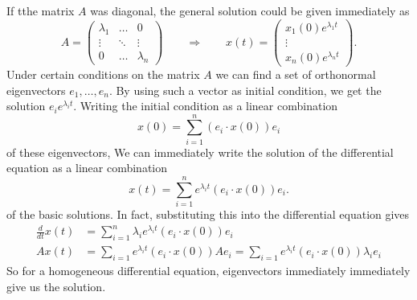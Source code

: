 If tthe matrix $A$ was diagonal, the general solution could be given
immediately as
\[
A=\begin{pmatrix}
\lambda_1&\dots&0\\
\vdots&\ddots&\vdots\\
0&\dots&\lambda_n
\end{pmatrix}
\qquad\Rightarrow\qquad
x(t)=\begin{pmatrix}
x_1(0)e^{\lambda_1t}
\\
\vdots
\\
x_n(0)e^{\lambda_nt}
\end{pmatrix}.
\]
Under certain conditions on the matrix $A$ we can find a set of
orthonormal eigenvectors $e_1,\dots,e_n$.
By using such a vector as initial condition, we get the solution
$e_ie^{\lambda_it}$.
Writing the initial condition as a linear combination
\[
x(0)=\sum_{i=1}^n(e_i \cdot x(0))e_i
\]
of these eigenvectors,
We can immediately write the solution of the differential equation
as a linear combination
\begin{equation}
x(t)=\sum_{i=1}^n
e^{\lambda_i t}
(e_i\cdot x(0))e_i
.
\label{development}
\end{equation}
of the basic solutions.
In fact, substituting this into the differential equation gives
\begin{align*}
\frac{d}{dt}x(t)&=\sum_{i=1}^n\lambda_ie^{\lambda_i t}(e_i\cdot x(0))e_i
\\
Ax(t)
&=\sum_{i=1}e^{\lambda_it}(e_i\cdot x(0))Ae_i
=\sum_{i=1}e^{\lambda_it}(e_i\cdot x(0))\lambda_i e_i
\end{align*}
So for a homogeneous differential equation, eigenvectors immediately
immediately give us the solution.

